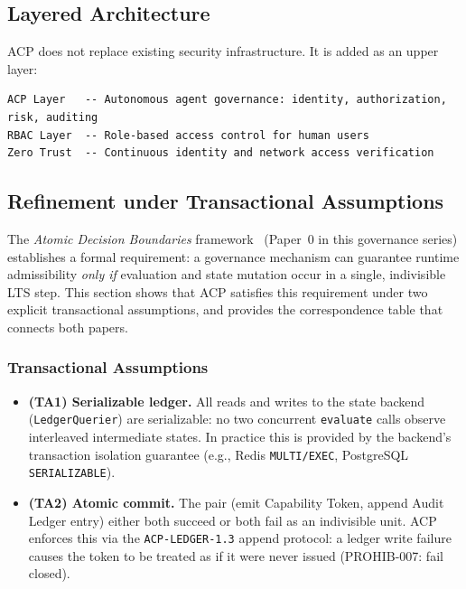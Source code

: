 \documentclass[11pt]{article}
\theoremstyle{definition}
\begin{document}
\subsection{Layered Architecture}

ACP does not replace existing security infrastructure. It is added as an upper layer:

\begin{lstlisting}
ACP Layer   -- Autonomous agent governance: identity, authorization, risk, auditing
RBAC Layer  -- Role-based access control for human users
Zero Trust  -- Continuous identity and network access verification
\end{lstlisting}

\subsection{Refinement under Transactional Assumptions}
\label{sec:refinement}

The \emph{Atomic Decision Boundaries} framework~\cite{fernandez2026a} (Paper~0 in
this governance series) establishes a formal requirement: a governance mechanism
can guarantee runtime admissibility \emph{only if} evaluation and state mutation
occur in a single, indivisible LTS step.  This section shows that ACP satisfies
this requirement under two explicit transactional assumptions, and provides the
correspondence table that connects both papers.

\subsubsection*{Transactional Assumptions}

\begin{itemize}[noitemsep]
  \item \textbf{(TA1) Serializable ledger.}
        All reads and writes to the state backend (\texttt{LedgerQuerier}) are
        serializable: no two concurrent \texttt{evaluate} calls observe
        interleaved intermediate states.  In practice this is provided by
        the backend's transaction isolation guarantee (e.g., Redis
        \texttt{MULTI/EXEC}, PostgreSQL \texttt{SERIALIZABLE}).
  \item \textbf{(TA2) Atomic commit.}
        The pair (emit Capability Token, append Audit Ledger entry) either
        both succeed or both fail as an indivisible unit.  ACP enforces this
        via the \texttt{ACP-LEDGER-1.3} append protocol: a ledger write failure
        causes the token to be treated as if it were never issued
        (PROHIB-007: fail closed).
\end{itemize}
\end{document}
